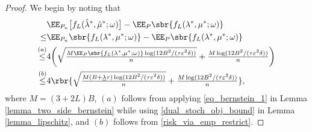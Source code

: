 \documentclass[9pt]{article} %
\numberwithin{equation}{section}
\renewcommand{\frac}[2]{\tfrac{#1}{#2}}
\begin{document}
\begin{proof}
We begin by noting that  
\begin{align}
& \EE_{P_n} \big[{f_L (\hat{\lambda}^*, \hat{\mu}^*; \omega)}\big]
- 
\EE_{P} \sbr{f_L ({\lambda}^*, {\mu}^*; \omega)} \nonumber \\
\leq & 
\EE_{P_n} \sbr{f_L ({\lambda}^*, {\mu}^*; \omega)}
- 
\EE_{P} \sbr{f_L ({\lambda}^*, {\mu}^*; \omega)} 
\nonumber \\
\overset{(a)}{\leq} & 
 4 \bigg({
\sqrt{\frac{ M  {\EE_{P} \sbr{f_L ( \lambda^*,  \mu^*; \omega) }
} \log(12B^2/(\tau \varepsilon^2 \delta))}{n}} + \frac{ M \log(12B^2/(\tau \varepsilon^2 \delta))}{n} 
} \bigg)
\nonumber \\
\overset{(b)}{\leq} &   4 \rbr{
\sqrt{\frac{ M 
(B + \underline{\lambda} \tau  )
 \log(12B^2/(\tau \varepsilon^2 \delta))}{n}} + \frac{ M \log(12B^2/(\tau \varepsilon^2 \delta))}{n} 
}, \label{ineq_bernstein_at_pop_dual}
\end{align}
where $M = (3+2L)B$, $(a)$ follows from applying  \eqref{eq_bernstein_1} in  Lemma \ref{lemma_two_side_bernstein} while using  \eqref{dual_stoch_obj_bound} in Lemma \ref{lemma_lipschitz},
and $(b)$ follows from \eqref{risk_via_emp_restrict}.



\end{proof}
\end{document}
